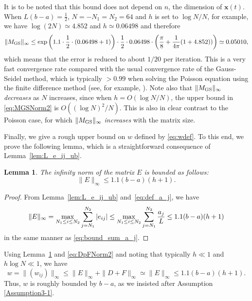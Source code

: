\documentclass[pdflatex,sn-mathphys-num]{sn-jnl}%
\theoremstyle{thmstyleone}%
\theoremstyle{thmstyletwo}%
\newtheorem{lemma}{Lemma}%
\theoremstyle{thmstylethree}%
\begin{document}
It is to be noted that this bound does not depend on $n$, the dimension of ${\bm x}(t)$.
When $L(b-a)=\frac{1}{2}$, 
$N = -N_{1} = N_{2} = 64$ and 
$h$ is set to $\log N/N$, for example, we have $\log(2N)\simeq 4.852$ and $h\simeq 0.06498$ and therefore
\begin{equation}
\|M_{\rm GS}\|_{\infty} 
\le 
\exp \left( 1.1\cdot \frac{1}{2} \cdot(0.06498+1) \right) \cdot
\frac{1}{2}\cdot 0.06498 \cdot
\left(\frac{\pi}{8}+\frac{1}{4\pi}(1+4.852))\right) 
\simeq 0.05010,
\label{eq:MGSboundsample}
\end{equation}
which means that the error is reduced to about $1/20$ per iteration. 
This is a very fast convergence rate compared with the usual convergence rate of the Gauss-Seidel method, which is typically $>0.99$ when solving the Poisson equation using the finite difference method (see, for example, \cite[Table 3.1]{Sugihara09}). Note also that $\|M_{\rm GS}\|_{\infty}$ {\it decreases} as $N$ increases, since when $h=O(\log N/N)$, the upper bound in \eqref{eq:MGSNorm2} is $O((\log N)^2/N)$. This is also in clear contrast to the Poisson case, for which $\|M_{\rm GS}\|_{\infty}$ {\it increases} with the matrix size.

Finally, we give a rough upper bound on $w$ defined by \eqref{eq:wdef}. 
To this end, we prove the following lemma, 
which is a straightforward consequence of Lemma~\ref{lem:L_e_ij_ub}. 

\begin{lemma}
\label{thm:Ebound}
The infinity norm of the matrix $E$ is bounded as follows: 
\[
\| E \|_{\infty} \leq 1.1(b-a) ( h  + 1 ). 
\]
\end{lemma}

\begin{proof}
From Lemma~\ref{lem:L_e_ij_ub} and~\eqref{eq:def_a_j}, we have
\begin{align}
\| E \|_{\infty} 
= 
\max_{N_{1} \leq i \leq N_{2}} \sum_{j = N_{1}}^{N_{2}} |e_{ij}| 
\leq
\max_{N_{1} \leq i \leq N_{2}} \sum_{j = N_{1}}^{N_{2}} \frac{a_{j}}{L} 
\leq 
1.1(b-a) ( h  + 1 )
\notag
\end{align}
in the same manner as \eqref{eq:bound_sum_a_j}. 
\end{proof}

\noindent
Using Lemma~\ref{thm:Ebound} and \eqref{eq:DpFNorm2} and noting that typically $h\ll 1$ and $h\log N\ll 1$, we have
\begin{equation}
w=\|(w_{ij})\|_{\infty} \le \|E\|_{\infty}+\|D+F\|_{\infty} \simeq \|E\|_{\infty} \le 1.1(b-a) ( h  + 1 ).
\end{equation}
Thus, $w$ is roughly bounded by $b-a$, as we insisted after Assumption \ref{Assumption3-1}.
\end{document}
